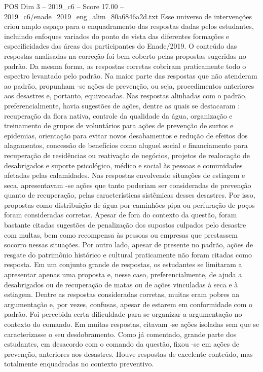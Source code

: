 \begin{textsample}{POS Dim 3 – 2019\_c6 – Score 17.00 – 2019\_c6/enade\_2019\_eng\_alim\_80a6846a2d.txt}
Esse universo de intervenções criou amplo espaço para o enquadramento das respostas dadas pelos estudantes, incluindo enfoques variados do ponto de vista das diferentes formações e especificidades das áreas dos participantes do Enade/2019.
O conteúdo das respostas analisadas na correção foi bem coberto pelas propostas sugeridas no padrão.
Da mesma forma, as respostas corretas cobriram praticamente todo o espectro levantado pelo padrão.
Na maior parte das respostas que não atenderam ao padrão, propunham -se ações de prevenção, ou seja, procedimentos anteriores aos desastres e, portanto, equivocadas.
Nas respostas alinhadas com o padrão, preferencialmente, havia sugestões de ações, dentre as quais se destacaram : recuperação da flora nativa, controle da qualidade da água, organização e treinamento de grupos de voluntários para ações de prevenção de surtos e epidemias, orientação para evitar novos desabamentos e redução de efeitos dos alagamentos, concessão de benefícios como aluguel social e financiamento para recuperação de residências ou reativação de negócios, projetos de realocação de desabrigados e suporte psicológico, médico e social às pessoas e comunidades afetadas pelas calamidades.
Nas respostas envolvendo situações de estiagem e seca, apresentavam -se ações que tanto poderiam ser consideradas de prevenção quanto de recuperação, pelas características sistêmicas desses desastres.
Por isso, propostas como distribuição de água por caminhões pipa ou perfuração de poços foram consideradas corretas.
Apesar de fora do contexto da questão, foram bastante citadas sugestões de penalização dos supostos culpados pelo desastre com multas, bem como recompensa às pessoas ou empresas que prestassem socorro nessas situações.
Por outro lado, apesar de presente no padrão, ações de resgate do patrimônio histórico e cultural praticamente não foram citadas como resposta.
Em um conjunto grande de respostas, os estudantes se limitaram a apresentar apenas uma proposta e, nesse caso, preferencialmente, de ajuda a desabrigados ou de recuperação de matas ou de ações vinculadas à seca e à estiagem.
Dentre as respostas consideradas corretas, muitas eram pobres na argumentação e, por vezes, confusas, apesar de estarem em conformidade com o padrão.
Foi percebida certa dificuldade para se organizar a argumentação no contexto do comando.
Em muitas respostas, citavam -se ações isoladas sem que se caracterizasse o seu desdobramento.
Como já comentado, grande parte dos estudantes, em desacordo com o comando da questão, fixou -se em ações de prevenção, anteriores aos desastres.
Houve respostas de excelente conteúdo, mas totalmente enquadradas no contexto preventivo.

\end{textsample}
